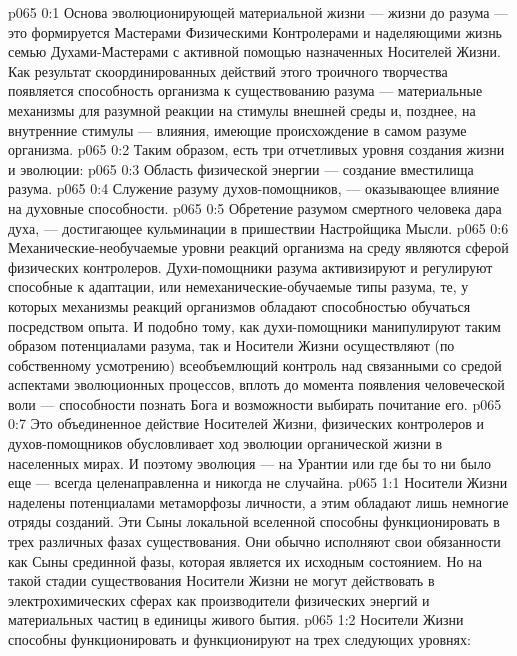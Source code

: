 \author{Носитель Жизни}
\vs p065 0:1 Основа эволюционирующей материальной жизни --- жизни до разума --- это формируется Мастерами Физическими Контролерами и наделяющими жизнь семью Духами\hyp{}Мастерами с активной помощью назначенных Носителей Жизни. Как результат скоординированных действий этого троичного творчества появляется способность организма к существованию разума --- материальные механизмы для разумной реакции на стимулы внешней среды и, позднее, на внутренние стимулы --- влияния, имеющие происхождение в самом разуме организма.
\vs p065 0:2 \pc Таким образом, есть три отчетливых уровня создания жизни и эволюции:
\vs p065 0:3 \bibnobreakspace Область физической энергии --- создание вместилища разума.
\vs p065 0:4 \bibnobreakspace Служение разуму духов\hyp{}помощников, --- оказывающее влияние на духовные способности.
\vs p065 0:5 \bibnobreakspace Обретение разумом смертного человека дара духа, --- достигающее кульминации в пришествии Настройщика Мысли.
\vs p065 0:6 \pc Механические\hyp{}необучаемые уровни реакций организма на среду являются сферой физических контролеров. Духи\hyp{}помощники разума активизируют и регулируют способные к адаптации, или немеханические\hyp{}обучаемые типы разума, те, у которых механизмы реакций организмов обладают способностью обучаться посредством опыта. И подобно тому, как духи\hyp{}помощники манипулируют таким образом потенциалами разума, так и Носители Жизни осуществляют (по собственному усмотрению) всеобъемлющий контроль над связанными со средой аспектами эволюционных процессов, вплоть до момента появления человеческой воли --- способности познать Бога и возможности выбирать почитание его.
\vs p065 0:7 Это объединенное действие Носителей Жизни, физических контролеров и духов\hyp{}помощников обусловливает ход эволюции органической жизни в населенных мирах. И поэтому эволюция --- на Урантии или где бы то ни было еще --- всегда целенаправленна и никогда не случайна.
\vs p065 1:1 Носители Жизни наделены потенциалами метаморфозы личности, а этим обладают лишь немногие отряды созданий. Эти Сыны локальной вселенной способны функционировать в трех различных фазах существования. Они обычно исполняют свои обязанности как Сыны срединной фазы, которая является их исходным состоянием. Но на такой стадии существования Носители Жизни не могут действовать в электрохимических сферах как производители физических энергий и материальных частиц в единицы живого бытия.
\vs p065 1:2 Носители Жизни способны функционировать и функционируют на трех следующих уровнях:
